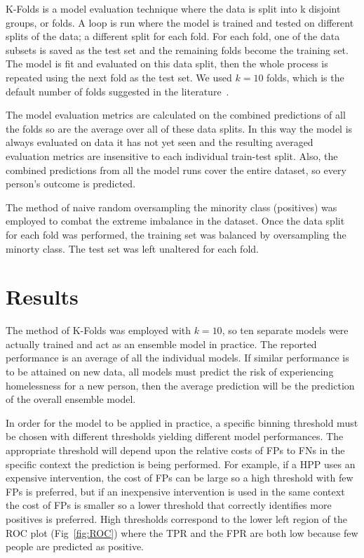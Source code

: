 \documentclass[10pt,letterpaper]{article}
\begin{document}
K-Folds is a model evaluation technique where the data is split into k disjoint groups, or folds. A loop is run where the model is trained and tested on different splits of the data; a different split for each fold. For each fold, one of the data subsets is saved as the test set and the remaining folds become the training set. The model is fit and evaluated on this data split, then the whole process is repeated using the next fold as the test set. We used $k = 10$ folds, which is the default number of folds suggested in the literature~\cite{marcot2020optimal}.

The model evaluation metrics are calculated on the combined predictions of all the folds so are the average over all of these data splits. In this way the model is always evaluated on data it has not yet seen and the resulting averaged evaluation metrics are insensitive to each individual train-test split. Also, the combined predictions from all the model runs cover the entire dataset, so every person's outcome is predicted.

The method of naive random oversampling the minority class (positives) was employed to combat the extreme imbalance in the dataset. Once the data split for each fold was performed, the training set was balanced by oversampling the minorty class. The test set was left unaltered for each fold.


\section*{Results}
The method of K-Folds was employed with $k=10$, so ten separate models were actually trained and act as an ensemble model in practice. The reported performance is an average of all the individual models. If similar performance is to be attained on new data, all models must predict the risk of experiencing homelessness for a new person, then the average prediction will be the prediction of the overall ensemble model.

In order for the model to be applied in practice, a specific binning threshold must be chosen with different thresholds yielding different model performances. The appropriate threshold will depend upon the relative costs of FPs to FNs in the specific context the prediction is being performed. For example, if a HPP uses an expensive intervention, the cost of FPs can be large so a high threshold with few FPs is preferred, but if an inexpensive intervention is used in the same context the cost of FPs is smaller so a lower threshold that correctly identifies more positives is preferred. High thresholds correspond to the lower left region of the ROC plot (Fig~\ref{fig:ROC}) where the TPR and the FPR are both low because few people are predicted as positive.
\end{document}
